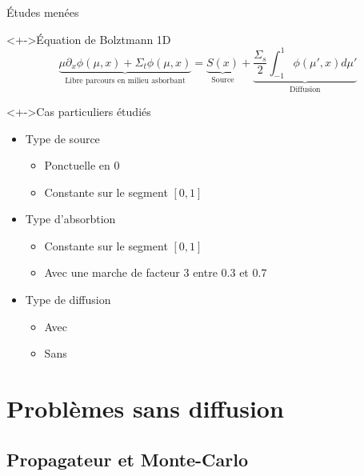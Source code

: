 \documentclass[17pt]{beamer}
\newenvironment{blockitemize}[1]{
  \begin{block}<+->{#1}
    \begin{itemize}
    }{
    \end{itemize}
  \end{block}
}
\begin{document}
\begin{frame}{Études menées}
  \begin{block}<+->{Équation de Bolztmann 1D}
    \[
      \underbrace{\mu \partial_x \phi(\mu, x) + \Sigma_t \phi(\mu, x)}_{\text{Libre parcours en milieu asborbant}}
      =
      \underbrace{S(x)}_{\text{Source}} + \underbrace{\frac{\Sigma_s}{2} \int_{-1}^1 \phi(\mu', x) d\mu'}_{\text{Diffusion}}
    \]
  \end{block}
  \begin{blockitemize}{Cas particuliers étudiés}
  \item Type de source
    \begin{itemize}
    \item Ponctuelle en 0
    \item Constante sur le segment $[0,1]$
    \end{itemize}
  \item Type d'absorbtion
    \begin{itemize}
    \item Constante sur le segment $[0,1]$
    \item Avec une marche de facteur $3$ entre $0.3$ et $0.7$
    \end{itemize}
  \item Type de diffusion
    \begin{itemize}
    \item Avec
    \item Sans
    \end{itemize}
  \end{blockitemize}
\end{frame}

\section{Problèmes sans diffusion}

\begin{frame}
  \tableofcontents[currentsection]
\end{frame}

\subsection{Propagateur et Monte-Carlo}
\end{document}
